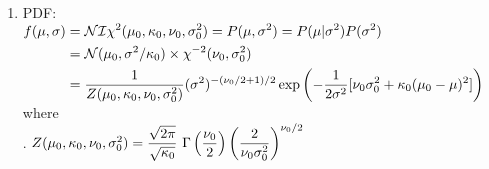 \begin{enumerate}
\begin{enumerate}
        \item PDF:
        $
            \begin{aligned}
                f (\mu, \sigma) 
                &= \mathcal{N I} \chi^2(\mu_0, \kappa_0, \nu_0, \sigma^2_0 ) 
                    = P(\mu, \sigma^2) = P(\mu|\sigma^2) P(\sigma^2) \\
                &= \mathcal{N} (\mu_0, \sigma^2/\kappa_0) \times \chi^{-2}(\nu_0, \sigma^2_0 ) \\
                &= \dfrac{1}{Z (\mu_0, \kappa_0, \nu_0, \sigma^2_0 ) } (\sigma^2)^{-(\nu_0 /2+1)/2} 
                    \exp \left(-\dfrac{1}{2\sigma^2}  [\nu_0\sigma^2_0 + \kappa_0(\mu_0 - \mu)^2]\right)
            \end{aligned}
        $
        \hfill \cite{statistics/book/Statistics-for-Data-Scientists/Maurits-Kaptein}
        \\[0.2cm]
        where 
        \hfill \cite{statistics/book/Statistics-for-Data-Scientists/Maurits-Kaptein}
        \\[0.2cm]
        .\hfill
        $
            Z (\mu_0, \kappa_0, \nu_0, \sigma^2_0 )
            = \dfrac{\sqrt{2\pi}}{\sqrt{\kappa_0}} \ \Gamma\dParenBrac{\dfrac{\nu_0}{2}} \dParenBrac{\dfrac{2}{\nu_0 \sigma^2_0}}^{\nu_0/2}
        $
        \hfill \cite{statistics/book/Statistics-for-Data-Scientists/Maurits-Kaptein}
    \end{enumerate}

    
\end{enumerate}





